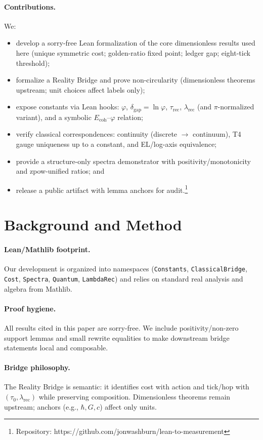 \documentclass[11pt]{article}
\newcommand{\LeanRepoURL}{https://github.com/jonwashburn/lean-to-measurement}
\begin{document}
\paragraph{Contributions.} We:
\begin{itemize}[leftmargin=1.25em]
  \item develop a sorry-free Lean formalization of the core dimensionless results used here (unique symmetric cost; golden-ratio fixed point; ledger gap; eight-tick threshold);
  \item formalize a Reality Bridge and prove non-circularity (dimensionless theorems upstream; unit choices affect labels only);
  \item expose constants via Lean hooks: $\varphi$, $\delta_{\!\text{gap}}=\ln\varphi$, $\tau_{\mathrm{rec}}$, $\lambda_{\mathrm{rec}}$ (and $\pi$-normalized variant), and a symbolic $E_{\mathrm{coh}}$–$\varphi$ relation;
  \item verify classical correspondences: continuity (discrete $\to$ continuum), T4 gauge uniqueness up to a constant, and EL/log-axis equivalence;
  \item provide a structure-only spectra demonstrator with positivity/monotonicity and zpow-unified ratios; and
  \item release a public artifact with lemma anchors for audit.\footnote{Repository: \LeanRepoURL}
\end{itemize}

\section{Background and Method}
\paragraph{Lean/Mathlib footprint.} Our development is organized into namespaces (\texttt{Constants}, \texttt{ClassicalBridge}, \texttt{Cost}, \texttt{Spectra}, \texttt{Quantum}, \texttt{LambdaRec}) and relies on standard real analysis and algebra from Mathlib.

\paragraph{Proof hygiene.} All results cited in this paper are sorry-free. We include positivity/non-zero support lemmas and small rewrite equalities to make downstream bridge statements local and composable.

\paragraph{Bridge philosophy.} The Reality Bridge is semantic: it identifies cost with action and tick/hop with $(\tau_0,\lambda_{\mathrm{rec}})$ while preserving composition. Dimensionless theorems remain upstream; anchors (e.g., $\hbar, G, c$) affect only units.
\end{document}
